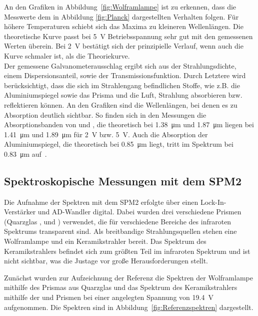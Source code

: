 \documentclass[a4paper,twoside,final]{article}
\begin{document}


\FloatBarrier
An den Grafiken in Abbildung~\ref{fig:Wolframlampe} ist zu erkennen, dass die Messwerte dem in Abbildung \ref{fig:Planck} dargestellten Verhalten folgen. Für höhere Temperaturen schiebt sich das Maxima zu kleineren Wellenlängen. Die theoretische Kurve passt bei \SI{5}{\volt} Betriebsspannung sehr gut mit den gemessenen Werten überein. Bei \SI{2}{\volt} bestätigt sich der prinzipielle Verlauf, wenn auch die Kurve schmaler ist, als die Theoriekurve.\\
Der gemessene Galvanometerausschlag ergibt sich aus der Strahlungsdichte, einem Dispersionsanteil, sowie der Transmissionsfunktion. Durch Letztere wird berücksichtigt, dass die sich im Strahlengang befindlichen Stoffe, wie z.B. die Aluminiumspiegel sowie das Prisma und die Luft, Strahlung absorbieren bzw. reflektieren können. An den Grafiken sind die Wellenlängen, bei denen es zu Absorption deutlich sichtbar. So finden sich in den Messungen die Absorptionsbanden von  und , die theoretisch bei \SI{1.38}{\micro\meter} und \SI{1.87}{\micro\meter} liegen bei \SI{1.41}{\micro\meter} und \SI{1.89}{\micro\meter} für \SI{2}{\volt} bzw. \SI{5}{\volt}. Auch die Absorption der Aluminiumspiegel, die theoretisch bei \SI{0.85}{\micro\meter} liegt, tritt im Spektrum bei \SI{0.83}{\micro\meter} auf~\cite{Mutschke}.

\subsection{Spektroskopische Messungen mit dem SPM2}

Die Aufnahme der Spektren mit dem SPM2 erfolgte über einen Lock-In-Verstärker und AD-Wandler digital. Dabei wurden drei verschiedene Prismen (Quarzglas ,  und ) verwendet, die für verschiedene Bereiche des infraroten Spektrums transparent sind. Als breitbandige Strahlungsquellen stehen eine Wolframlampe und ein Keramikstrahler bereit. Das Spektrum des Keramikstrahlers befindet sich zum größten Teil im infraroten Spektrum und ist nicht sichtbar, was die Justage vor große Herausforderungen stellt.

Zunächst wurden zur Aufzeichnung der Referenz die Spektren der Wolframlampe mithilfe des Prismas aus Quarzglas und das Spektrum des Keramikstrahlers mithilfe der  und  Prismen bei einer angelegten Spannung von \SI{19.4}{\volt} aufgenommen. Die Spektren sind in Abbildung~\ref{fig:Referenzspektren} dargestellt.
\end{document}
